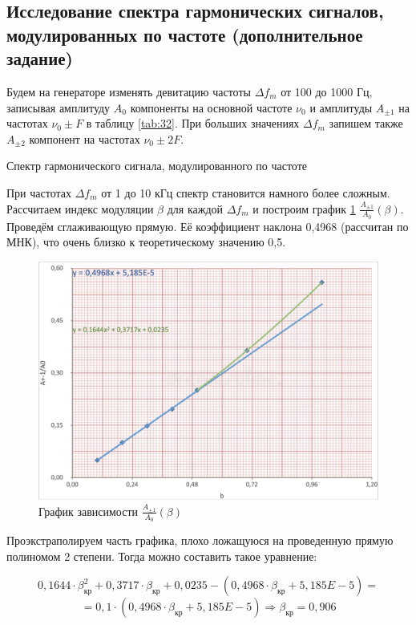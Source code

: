 \documentclass[12pt,a4paper]{article}
\begin{document}
\subsection*{Исследование спектра гармонических сигналов, модулированных по частоте (дополнительное задание)}

Будем на генераторе изменять девитацию частоты $\Delta f_m$ от 100 до 1000 Гц, записывая амплитуду $A_0$ компоненты на основной частоте $\nu_0$ и амплитуды $A_{\pm1}$ на частотах $\nu_0 \pm F$ в таблицу \ref{tab:32}. При больших значениях $\Delta f_m$ запишем также $A_{\pm2}$ компонент на частотах $\nu_0 \pm 2F$.

\begin{table}[H]
    \caption{Спектр гармонического сигнала, модулированного по частоте}
    
	\label{tab:32}
\end{table}

При частотах $\Delta f_m$ от 1 до 10 кГц спектр становится намного более сложным. Рассчитаем индекс модуляции $\beta$ для каждой $\Delta f_m$ и построим график \ref{fig:32} $\frac{A_{\pm1}}{A_0}(\beta)$. Проведём сглаживающую прямую. Её коэффициент наклона 0,4968 (рассчитан по МНК), что очень близко к теоретическому значению 0,5. 

\begin{figure}[H]
	\centering
	\includegraphics[width = 10 cm]{src/32.png}
	\caption{График зависимости $\frac{A_{\pm1}}{A_0}(\beta)$}
	\label{fig:32}
\end{figure}

Проэкстраполируем часть графика, плохо ложащуюся на проведенную прямую полиномом 2 степени. Тогда можно составить такое уравнение:

$$ 0,1644 \cdot \beta_\text{кр} ^ 2 + 0,3717 \cdot \beta_\text{кр} + 0,0235 - (0,4968 \cdot \beta_\text{кр} + 5,185E-5) = $$
$$ = 0,1 \cdot (0,4968 \cdot \beta_\text{кр} + 5,185E-5) \Rightarrow \beta_\text{кр} = 0,906 $$
\end{document}
